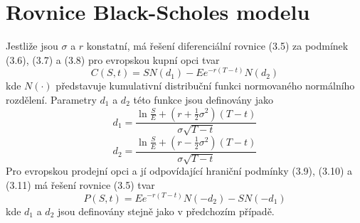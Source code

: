 \documentclass[a4paper]{book}
\begin{document}
\section{Rovnice Black-Scholes modelu}

Jestliže jsou $\sigma$ a $r$ konstatní, má řešení diferenciální rovnice (3.5) za podmínek (3.6), (3.7) a (3.8) pro evropskou kupní opci tvar
\begin{equation*}
C(S,t) = S N(d_1) - Ee^{-r(T-t)}N(d_2)
\end{equation*}
kde $N(\cdot)$ představuje kumulativní distribuční funkci normovaného normálního rozdělení. Parametry $d_1$ a $d_2$ této funkce jsou definovány jako
\begin{equation*}
d_1 = \frac{\ln \frac{S}{E}+(r+\frac{1}{2}\sigma^2)(T-t)}{\sigma \sqrt{T-t}}
\end{equation*}
\begin{equation*}
d_2 = \frac{\ln \frac{S}{E}+(r-\frac{1}{2}\sigma^2)(T-t)}{\sigma \sqrt{T-t}}
\end{equation*}
Pro evropskou prodejní opci a jí odpovídající hraniční podmínky (3.9), (3.10) a (3.11) má řešení rovnice (3.5) tvar
\begin{equation*}
P(S,t)=Ee^{-r(T-t)}N(-d_2) - SN(-d_1)
\end{equation*}
kde $d_1$ a $d_2$ jsou definovány stejně jako v předchozím případě.
\end{document}
